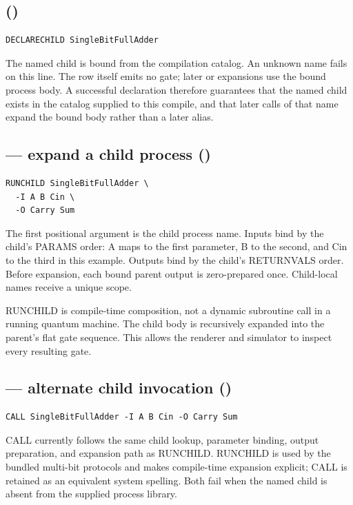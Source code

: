\subsection{ (\implemented)}

\begin{lstlisting}
DECLARECHILD SingleBitFullAdder
\end{lstlisting}
The named child is bound from the compilation  catalog.
An unknown name fails on this line. The row itself emits no gate; later
 or  expansions use the bound process body.
A successful declaration therefore guarantees that the named child exists in
the catalog supplied to this compile, and that later calls of that name expand
the bound body rather than a later alias.

\subsection{ --- expand a child process (\implemented)}

\begin{lstlisting}
RUNCHILD SingleBitFullAdder \
  -I A B Cin \
  -O Carry Sum
\end{lstlisting}
The first positional argument is the child process name. Inputs bind by the
child's PARAMS order: A maps to the first parameter, B to the second, and Cin
to the third in this example. Outputs bind by the child's RETURNVALS order.
Before expansion, each bound parent output is zero-prepared once. Child-local
names receive a unique scope.

RUNCHILD is compile-time composition, not a dynamic subroutine call in a
running quantum machine. The child body is recursively expanded into the
parent's flat gate sequence. This allows the renderer and simulator to inspect
every resulting gate.

\subsection{ --- alternate child invocation (\implemented)}

\begin{lstlisting}
CALL SingleBitFullAdder -I A B Cin -O Carry Sum
\end{lstlisting}
CALL currently follows the same child lookup, parameter binding, output
preparation, and expansion path as RUNCHILD. RUNCHILD is used by the bundled
multi-bit protocols and makes compile-time expansion explicit; CALL is retained
as an equivalent system spelling. Both fail when the named child is absent from
the supplied process library.

